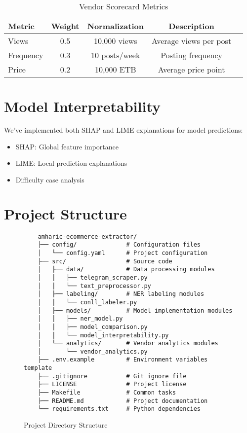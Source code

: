 \documentclass[12pt,a4paper]{article}
\begin{document}
\begin{table}[H]
    \centering
    \begin{tabular}{|l|c|c|c|c|}
        \hline
        \textbf{Metric} & \textbf{Weight} & \textbf{Normalization} & \textbf{Description} \\ \hline
        Views & 0.5 & 10,000 views & Average views per post \\ \hline
        Frequency & 0.3 & 10 posts/week & Posting frequency \\ \hline
        Price & 0.2 & 10,000 ETB & Average price point \\ \hline
    \end{tabular}
    \caption{Vendor Scorecard Metrics}
\end{table}

\section{Model Interpretability}

We've implemented both SHAP and LIME explanations for model predictions:
\begin{itemize}
    \item SHAP: Global feature importance
    \item LIME: Local prediction explanations
    \item Difficulty case analysis
\end{itemize}

\section{Project Structure}

\begin{figure}[H]
    \centering
    \begin{verbatim}
    amharic-ecommerce-extractor/
    ├── config/              # Configuration files
    │   └── config.yaml      # Project configuration
    ├── src/                 # Source code
    │   ├── data/            # Data processing modules
    │   │   ├── telegram_scraper.py
    │   │   └── text_preprocessor.py
    │   ├── labeling/        # NER labeling modules
    │   │   └── conll_labeler.py
    │   ├── models/          # Model implementation modules
    │   │   ├── ner_model.py
    │   │   ├── model_comparison.py
    │   │   └── model_interpretability.py
    │   └── analytics/       # Vendor analytics modules
    │       └── vendor_analytics.py
    ├── .env.example         # Environment variables template
    ├── .gitignore           # Git ignore file
    ├── LICENSE              # Project license
    ├── Makefile             # Common tasks
    ├── README.md            # Project documentation
    └── requirements.txt     # Python dependencies
    \end{verbatim}
    \caption{Project Directory Structure}
\end{figure}
\end{document}

